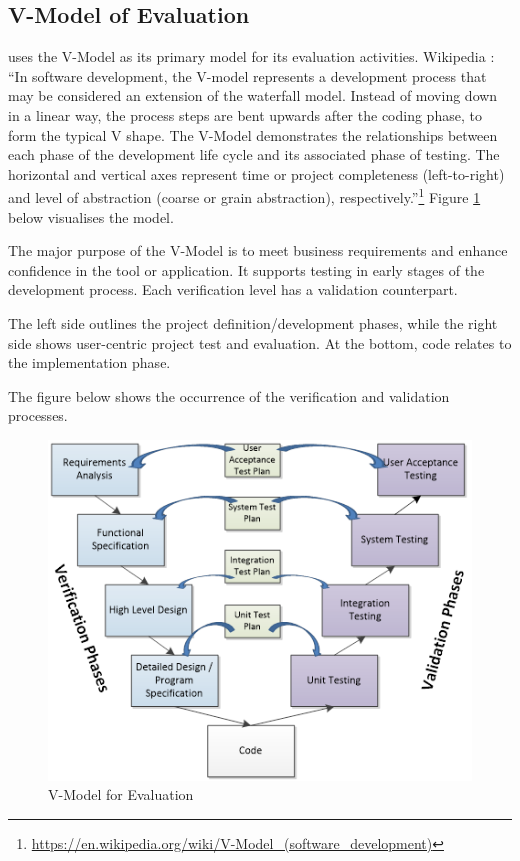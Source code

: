 \subsection{V-Model of Evaluation}\label{sec-vmodel}
\SUMMA uses the V-Model as its primary model for its evaluation activities. 
%
%
Wikipedia%
: ``In software development, the V-model represents a development process that may be considered an extension of the waterfall model. Instead of moving down in a linear way, the process steps are bent upwards after the coding phase, to form the typical V shape. The V-Model demonstrates the relationships between each phase of the development life cycle and its associated phase of testing. The horizontal and vertical axes represent time or project completeness (left-to-right) and level of abstraction (coarse or grain abstraction), respectively.''\footnote{\url{https://en.wikipedia.org/wiki/V-Model_(software_development)}}
Figure \ref{fig:V-Model} below visualises the model.

The major purpose of the V-Model is to meet business requirements and enhance confidence in the tool or application. It supports testing in early stages of the development process. Each verification level has a validation counterpart. 

The left side outlines the project definition/development phases, while the right side shows user-centric project test and evaluation. At the bottom, code relates to the implementation phase.

The figure below shows the occurrence of the verification and validation processes. 

\begin{figure}[ht]
    \centering
    \includegraphics[width=1.0\textwidth]{./images/V-Model.png}
    \caption{V-Model for Evaluation}
    \label{fig:V-Model}
\end{figure}


